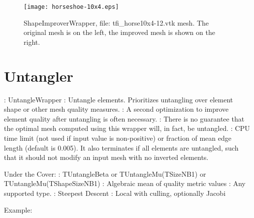 \begin{figure}[htbp]
\begin{center}
    \texttt{[image: horseshoe-10x4.eps]}
    \caption{ShapeImproverWrapper, file: tfi\_horse10x4-12.vtk mesh. The original mesh is on the left, the improved mesh is shown on the right.}
    \label{fig:inverted-hole-1}
\end{center}
\end{figure}

\newpage

\section{Untangler} \label{sec:Untangler}

: UntangleWrapper \newline
{}: Untangle elements.  Prioritizes untangling over
element shape or other mesh quality measures.  \newline
{}: A second optimization to improve element quality
after untangling is often necessary.  \newline
{}: There is no guarantee that the optimal mesh computed using this wrapper will, in fact, be untangled.  \newline 
{}: CPU time limit (not used if input 
value is non-positive) or fraction of mean edge length (default is 0.005).  It
also terminates if all elements are untangled, such that it should not modify
an input mesh with no inverted elements. \newline \newline

\noindent Under the Cover: \newline
{}: TUntangleBeta or TUntangleMu(TSizeNB1) or TUntangleMu(TShapeSizeNB1) \newline
{}: Algebraic mean of quality metric values \newline
{}: Any supported type. \newline
{}: Steepest Descent \newline
{}: Local with culling, optionally Jacobi \newline

\noindent Example: \newline

